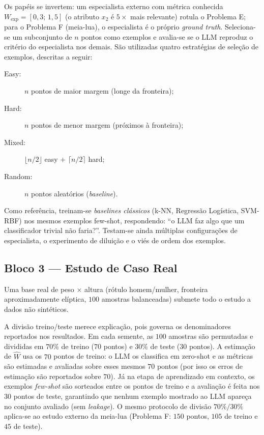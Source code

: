 \documentclass[12pt,a4paper]{article}
\newcommand{\West}{\ensuremath{\hat{W}}}   %
\begin{document}
Os papéis se invertem: um especialista externo com métrica conhecida
$W_{\text{exp}} = [0{,}3;\,1{,}5]$ (o atributo $x_2$ é $5\times$ mais relevante) rotula o
Problema E; para o Problema F (meia-lua), o especialista é o próprio \emph{ground truth}.
Seleciona-se um subconjunto de $n$ pontos como exemplos e avalia-se se o LLM reproduz o
critério do especialista nos demais. São utilizadas quatro estratégias de seleção de
exemplos, descritas a seguir:
\begin{description}
  \item[Easy:] $n$ pontos de maior margem (longe da fronteira);
  \item[Hard:] $n$ pontos de menor margem (próximos à fronteira);
  \item[Mixed:] $\lfloor n/2 \rfloor$ easy $+$ $\lceil n/2 \rceil$ hard;
  \item[Random:] $n$ pontos aleatórios (\emph{baseline}).
\end{description}
Como referência, treinam-se \emph{baselines clássicos} (k-NN, Regressão Logística, SVM-RBF)
nos mesmos exemplos few-shot, respondendo: ``o LLM faz algo que um classificador trivial não
faria?''. Testam-se ainda múltiplas configurações de especialista, o experimento de diluição
e o viés de ordem dos exemplos.

\subsection{Bloco 3 — Estudo de Caso Real}

Uma base real de peso $\times$ altura (rótulo homem/mulher, fronteira aproximadamente
elíptica, $100$ amostras balanceadas) submete todo o estudo a dados não sintéticos.

A divisão treino/teste merece explicação, pois governa os denominadores reportados nos
resultados. Em cada semente, as $100$ amostras são permutadas e divididas em $70\%$ de
treino ($70$ pontos) e $30\%$ de teste ($30$ pontos). A estimação de \West{} usa os $70$
pontos de treino: o LLM os classifica em zero-shot e as métricas são estimadas e avaliadas
sobre esses mesmos $70$ pontos (por isso os erros de estimação são reportados sobre $70$).
Já na etapa de aprendizado em contexto, os exemplos \emph{few-shot} são sorteados entre os
pontos de treino e a avaliação é feita nos $30$ pontos de teste, garantindo que nenhum
exemplo mostrado ao LLM apareça no conjunto avaliado (sem \emph{leakage}). O mesmo
protocolo de divisão $70\%/30\%$ aplica-se ao estudo externo da meia-lua (Problema F:
$150$ pontos, $105$ de treino e $45$ de teste).
\end{document}

